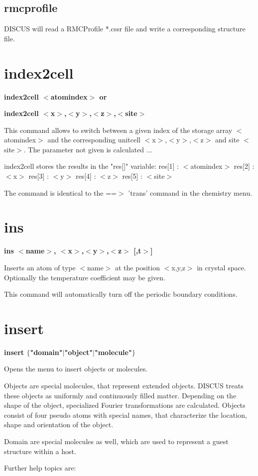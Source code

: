 \subsection*{rmcprofile}
\par
DISCUS will read a RMCProfile *.cssr file and write a corresponding 
structure file. 
\section{index2cell}
{\bf index2cell $ <$atomindex$> $ or \par }
{\bf index2cell $ <$x$> $,$ <$y$> $,$ <$z$> $,$ <$site$> $ \par }
\par
\vspace{3pt}
This command allows to switch between a given index of the 
storage array $ <$atomindex$> $ and the corresponding unitcell $ <$x$> $,$ <$y$> $,$ <$z$> $ 
and site $ <$site$> $. The parameter not given is calculated ... 
\par
index2cell stores the results in the "res[]" variable: 
res[1] : $ <$atomindex$> $ 
res[2] : $ <$x$> $ 
res[3] : $ <$y$> $ 
res[4] : $ <$z$> $ 
res[5] : $ <$site$> $ 
\par
The command is identical to the ==$> $ 'trans' command in the 
chemistry menu. 
\section{ins}
{\bf ins $ <$name$> $, $ <$x$> $,$ <$y$> $,$ <$z$> $ [,t$> $] \par }
\par
\vspace{3pt}
Inserts an atom of type $ <$name$> $ at the position $ <$x,y,z$> $ 
in crystal space. Optionally the temperature coefficient may be 
given. 
\par
This command will automatically turn off the periodic boundary 
conditions. 
\section{insert}
{\bf insert $ \{$"domain"$| $"object"$| $"molecule"$\} $ \par }
\par
\vspace{3pt}
Opens the menu to insert objects or molecules. 
\par
Objects are special molecules, that represent extended objects. 
DISCUS treats these objects as uniformly and continuously filled 
matter. Depending on the shape of the object, specialized 
Fourier transformations are calculated. 
Objects consist of four pseudo atoms with special names, that 
characterize the location, shape and orientation of the object. 
\par
Domain are special molecules as well, which are used to represent 
a guest structure within a host. 
\par
Further help topics are: 
\par
